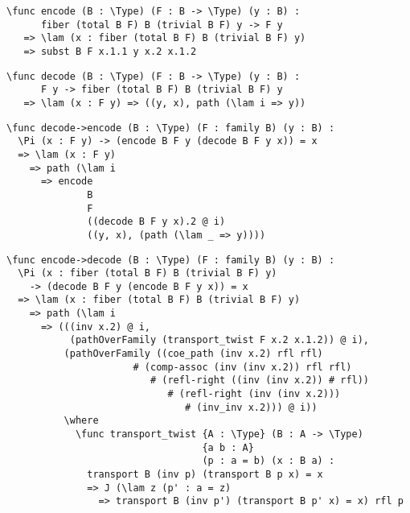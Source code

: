 \begin{ListingEnv}[H]
\begin{lstlisting}
\func encode (B : \Type) (F : B -> \Type) (y : B) :
      fiber (total B F) B (trivial B F) y -> F y
   => \lam (x : fiber (total B F) B (trivial B F) y)
   => subst B F x.1.1 y x.2 x.1.2
\end{lstlisting}
\end{ListingEnv}

\begin{ListingEnv}[H]
\begin{lstlisting}
\func decode (B : \Type) (F : B -> \Type) (y : B) :
      F y -> fiber (total B F) B (trivial B F) y
   => \lam (x : F y) => ((y, x), path (\lam i => y))
\end{lstlisting}
\end{ListingEnv}

\begin{ListingEnv}[H]
\begin{lstlisting}
\func decode->encode (B : \Type) (F : family B) (y : B) :
  \Pi (x : F y) -> (encode B F y (decode B F y x)) = x
  => \lam (x : F y)
    => path (\lam i
      => encode
              B
              F
              ((decode B F y x).2 @ i)
              ((y, x), (path (\lam _ => y))))
\end{lstlisting}
\end{ListingEnv}

\begin{ListingEnv}[H]
\begin{lstlisting}
\func encode->decode (B : \Type) (F : family B) (y : B) :
  \Pi (x : fiber (total B F) B (trivial B F) y)
    -> (decode B F y (encode B F y x)) = x
  => \lam (x : fiber (total B F) B (trivial B F) y)
    => path (\lam i
      => (((inv x.2) @ i,
           (pathOverFamily (transport_twist F x.2 x.1.2)) @ i),
          (pathOverFamily ((coe_path (inv x.2) rfl rfl)
                      # (comp-assoc (inv (inv x.2)) rfl rfl)
                         # (refl-right ((inv (inv x.2)) # rfl))
                            # (refl-right (inv (inv x.2)))
                               # (inv_inv x.2))) @ i))
          \where
            \func transport_twist {A : \Type} (B : A -> \Type)
                                  {a b : A}
                                  (p : a = b) (x : B a) :
              transport B (inv p) (transport B p x) = x
              => J (\lam z (p' : a = z)
                => transport B (inv p') (transport B p' x) = x) rfl p
\end{lstlisting}
\end{ListingEnv}

